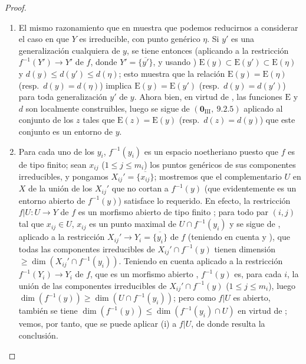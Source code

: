 \begin{proof}
\begin{enumerate}[label=(\roman*)]
  \item El mismo razonamiento que en  muestra que podemos reducirnos a considerar el caso en que $Y$ es irreducible, con punto genérico $\eta$.
  Si $y'$ es una generalización cualquiera de $y$, se tiene entonces (aplicando  a la restricción $f^{-1}(Y')\to Y'$ de $f$, donde $Y'=\overline{\{y'\}}$, y usando ) $\mathrm{E}(y)\subset\mathrm{E}(y')\subset\mathrm{E}(\eta)$ y $d(y)\leq d(y')\leq d(\eta)$; esto muestra que la relación $\mathrm{E}(y)=\mathrm{E}(\eta)$ (resp.\ $d(y)=d(\eta)$) implica $\mathrm{E}(y)=\mathrm{E}(y')$ (resp.\ $d(y)=d(y')$) para toda generalización $y'$ de $y$.
  Ahora bien, en virtud de , las funciones $\mathrm{E}$ y $d$ son localmente construibles, luego se sigue de $(\mathbf{0}_{\mathrm{III}},~9.2.5)$ aplicado al conjunto de los $z$ tales que $\mathrm{E}(z)=\mathrm{E}(y)$ (resp.\ $d(z)=d(y)$) que este conjunto es un entorno de $y$.

  \item Para cada uno de los $y_i$, $f^{-1}(y_i)$ es un espacio noetheriano puesto que $f$ es de tipo finito; sean $x_{ij}$ ($1\leq j\leq m_i$) los puntos genéricos de sus componentes irreducibles, y pongamos $X_{ij}'=\overline{\{x_{ij}\}}$; mostremos que el complementario $U$ en $X$ de la unión de los $X_{ij}'$ que no cortan a $f^{-1}(y)$ (que evidentemente es un entorno abierto de $f^{-1}(y)$) satisface lo requerido.
  En efecto, la restricción $f|U:U\to Y$ de $f$ es un morfismo abierto de tipo finito ; para todo par $(i,j)$ tal que $x_{ij}\in U$, $x_{ij}$ es un punto maximal de $U\cap f^{-1}(y_i)$ y se sigue de , aplicado a la restricción $X_{ij}'\to Y_i=\overline{\{y_i\}}$ de $f$ (teniendo en cuenta  y ), que todas las componentes irreducibles de $X_{ij}'\cap f^{-1}(y)$ tienen dimensión $\geq\dim(X_{ij}'\cap f^{-1}(y_i))$.
  Teniendo en cuenta  aplicado a la restricción $f^{-1}(Y_i)\to Y_i$ de $f$, que es un morfismo abierto , $f^{-1}(y)$ es, para cada $i$, la unión de las componentes irreducibles de $X_{ij}'\cap f^{-1}(y)$ ($1\leq j\leq m_i$), luego $\dim(f^{-1}(y))\geq\dim(U\cap f^{-1}(y_i))$; pero como $f|U$ es abierto, también se tiene $\dim(f^{-1}(y))\leq\dim(f^{-1}(y_i)\cap U)$ en virtud de ; vemos, por tanto, que se puede aplicar (i) a $f|U$, de donde resulta la conclusión.
\end{enumerate}
\end{proof}

